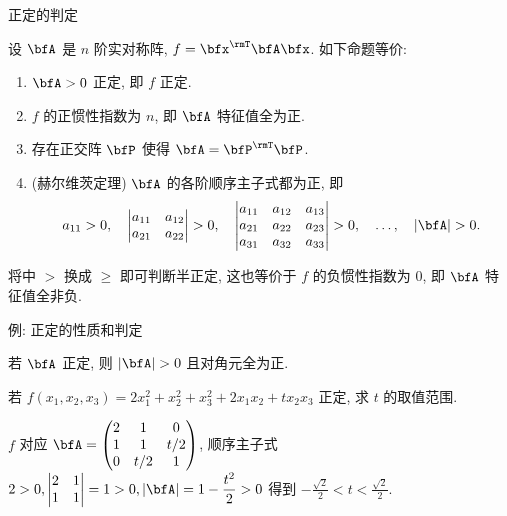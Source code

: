 \begin{frame}{正定的判定}
	\onslide<+->
	\begin{theorem}
		设 $\bfA$ 是 $n$ 阶实对称阵, $f=\bfx^\rmT\bfA\bfx$. 如下命题等价:
		\begin{enumerate}
			\item $\bfA>0$ 正定, 即 $f$ 正定.
			\item $f$ 的正惯性指数为 $n$, 即 $\bfA$ 特征值全为正.
			\item 存在正交阵 $\bfP$ 使得 $\bfA=\bfP^\rmT\bfP$.
			\item (赫尔维茨定理) $\bfA$ 的各阶顺序主子式都为正, 即
			\[a_{11}>0,\quad
			\begin{vmatrix}
				a_{11}&a_{12}\\
				a_{21}&a_{22}
			\end{vmatrix}>0,\quad
			\begin{vmatrix}
				a_{11}&a_{12}&a_{13}\\
				a_{21}&a_{22}&a_{23}\\
				a_{31}&a_{32}&a_{33}
			\end{vmatrix}>0,\quad
			\dots,\quad
			|\bfA|>0.\]\label{enum:hurwitz}
		\end{enumerate}
	\end{theorem}
	\onslide<+->
	将中 $>$ 换成 $\ge$ 即可判断半正定, 这也等价于 $f$ 的负惯性指数为 $0$, 即 $\bfA$ 特征值全非负.
\end{frame}


\begin{frame}{例: 正定的性质和判定}
	\onslide<+->
	\begin{corollary}
		若 $\bfA$ 正定, 则 $|\bfA|>0$ 且对角元全为正.
	\end{corollary}
	\onslide<+->
	\begin{example}
		若 $f(x_1,x_2,x_3)=2x_1^2+x_2^2+x_3^2+2x_1x_2+tx_2x_3$ 正定, 求 $t$ 的取值范围.
	\end{example}
	\onslide<+->
	\begin{solution}
		$f$ 对应 $\bfA=\begin{pmatrix}
			2&1&0\\
			1&1&t/2\\
			0&t/2&1
		\end{pmatrix}$, 顺序主子式 $2>0,\begin{vmatrix}
			2&1\\1&1
		\end{vmatrix}=1>0,|\bfA|=1-\dfrac{t^2}2>0$
		得到 $\displaystyle-\frac{\sqrt2}2<t<\frac{\sqrt2}2$.
	\end{solution}
\end{frame}


